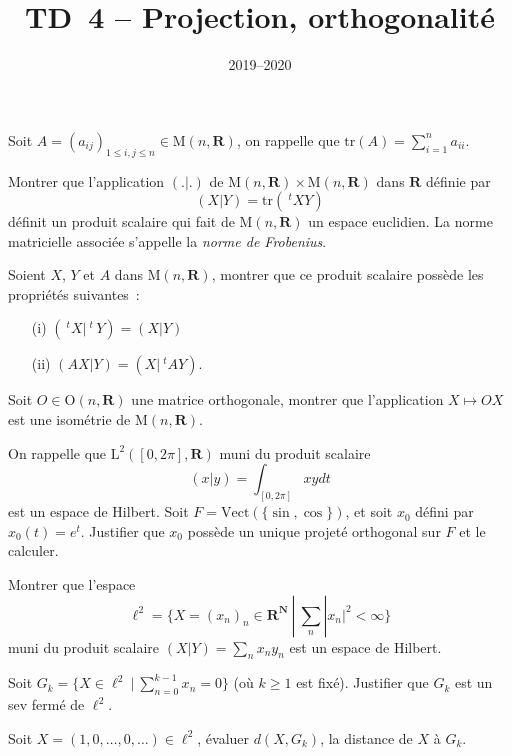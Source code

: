 \documentclass[11pt,a4paper]{article}
\title{TD~4 -- Projection, orthogonalit\'e}
\date{2019--2020}
\def\N{\mathbf{N}}
\def\R{\mathbf{R}}
\def\L{\mathrm{L}}
\def\M{\mathrm{M}}
\def\O{\mathrm{O}}
\def\tr{\mathrm{tr}}
\def\Vect{\mathrm{Vect}}
\def\iy{\infty}
\def\t{\ \!^t\!}
\begin{document}
\maketitle

\begin{Exercice}
Soit $A = (a_{ij})_{1 \leq i,j \leq n} \in \M(n,\R)$, on
rappelle que $\tr(A)=\sum_{i=1}^n a_{ii}$.
\begin{Question}
Montrer que l'application $(.|.)$ de $\M(n,\R) \times
\M(n,\R)$ dans $\R$ d\'efinie par
$$ (X|Y) = \tr(\t XY) $$
d\'efinit un produit scalaire qui fait de $\M(n,\R)$ un espace euclidien.
La norme matricielle associ\'ee s'appelle la \emph{norme de Frobenius}.
\end{Question}
\begin{Question} Soient $X$, $Y$ et $A$ dans $\M(n,\R)$, montrer que ce
produit scalaire poss\`ede les propri\'et\'es suivantes~:
\begin{itemize}
  \item[(i)]  $(\t X|\t\,Y) = (X|Y)$
  \item[(ii)] $(AX|Y) = (X|\t AY).$
\end{itemize}
\end{Question}
\begin{Question} Soit $O \in \O(n,\R)$ une matrice orthogonale, montrer
que l'application $X \mapsto OX$ est une isom\'etrie de $\M(n,\R)$.
\end{Question}
\end{Exercice} \vspace*{1em}

\begin{Exercice}
On rappelle que $\L^2([0,2\pi],\R)$ muni du produit scalaire
$$ (x|y) = \int_{[0,2\pi]} xydt $$
est un espace de Hilbert.
Soit $F = \Vect(\{\sin,\cos\})$, et soit $x_0$ d\'efini par
$x_0(t)=e^t$. Justifier que $x_0$ poss\`ede un unique projet\'e
orthogonal sur $F$ et le calculer.
\end{Exercice} \vspace*{1em}

\begin{Exercice}
\begin{Question} Montrer que l'espace
$$ \ell^2=\{X=(x_n)_n \in \R^\N\ |\ \sum_n |x_n|^2<\iy\} $$
muni du produit scalaire $(X|Y) = \sum_n x_n y_n$
est un espace de Hilbert. \end{Question}
\begin{Question} Soit $G_k = \{X \in \ell^2\ |\ \sum_{n=0}^{k-1} x_n = 0\}$
(o\`u $k \geq 1$ est fix\'e). Justifier que $G_k$ est un sev ferm\'e de
$\ell^2$. \end{Question}
\begin{Question} Soit $X=(1,0,\dots,0,\dots) \in \ell^2$, \'evaluer
$d(X,G_k)$, la distance de $X$ \`a $G_k$. \end{Question}
\end{Exercice} \vspace*{1em}
\end{document}
